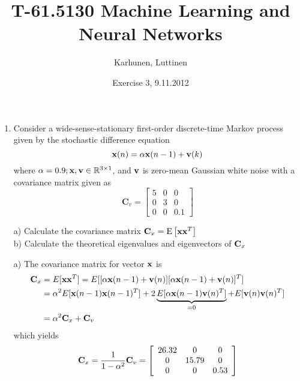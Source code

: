
\title{T-61.5130 Machine Learning and Neural Networks}
\author{Karhunen, Luttinen}
\date{Exercise 3, 9.11.2012}





\maketitle

\begin{enumerate}
  
\item Consider a wide-sense-stationary
  first-order discrete-time Markov process given by the stochastic
  difference equation
  \[
  {\bf x}(n) = \alpha {\bf x}(n-1) + {\bf v}(k)
  \]
  where $\alpha = 0.9; {\bf x}, {\bf v} \in \mathbb{R}^{3\times 1}$,
  and ${\bf v}$ is zero-mean Gaussian white noise with a covariance
  matrix given as
  \[ \textbf{C}_v = \left[ \begin{array}{ccc}
      5 & 0 & 0 \\
      0 & 3 & 0 \\
      0 & 0 & 0.1 \end{array} \right]\]

  a) Calculate the covariance matrix ${\bf C}_x = \text{E}\left[ {\bf
      xx}^T \right]$\\
  b) Calculate the theoretical eigenvalues and eigenvectors of ${\bf C}_x$

  \begin{solution}

    a) The covariance matrix for vector $\mathbf{x}$ is
    \[
    \begin{split}
      \mathbf{C}_x &=
      E[\mathbf{x} \mathbf{x}^T]=E[[\alpha\mathbf{x}(n-1)+\mathbf{v}(n)][\alpha\mathbf{x}(n-1)+\mathbf{v}(n)]^T]\\
      &=\alpha^2 E[\mathbf{x}(n-1)\mathbf{x}(n-1)^T]+2 \underbrace{E[\alpha \mathbf{x}(n-1)\mathbf{v}(n)^T]}_{=0}+ E[\mathbf{v}(n)\mathbf{v}(n)^T]\\
      &=\alpha^2 \mathbf{C}_x + \mathbf{C}_v
    \end{split}
    \]
    which yields
    \[
    \mathbf{C}_x = \frac{1}{1-\alpha^2}\mathbf{C}_v=
    \left[\begin{array}{ccc}
        26.32 & 0     & 0 \\
        0     & 15.79 & 0 \\
        0     & 0     & 0.53 
      \end{array}\right]
    \]



\end{solution}
\end{enumerate}
